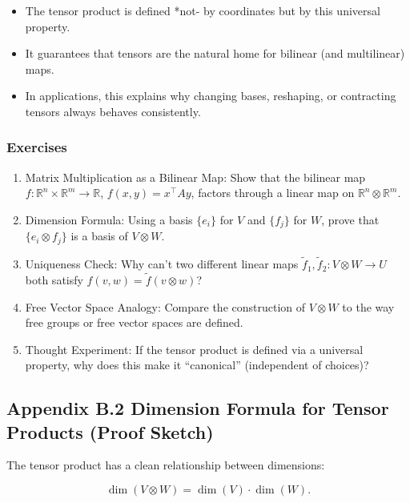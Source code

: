 \documentclass[
  letterpaper,
  DIV=11,
  numbers=noendperiod]{scrreprt}
\providecommand{\tightlist}{%
  \setlength{\itemsep}{0pt}\setlength{\parskip}{0pt}}
\begin{document}
\begin{itemize}
\tightlist
\item
  The tensor product is defined *not- by coordinates but by this
  universal property.
\item
  It guarantees that tensors are the natural home for bilinear (and
  multilinear) maps.
\item
  In applications, this explains why changing bases, reshaping, or
  contracting tensors always behaves consistently.
\end{itemize}

\subsubsection{Exercises}\label{exercises-75}

\begin{enumerate}
\def\labelenumi{\arabic{enumi}.}
\item
  Matrix Multiplication as a Bilinear Map: Show that the bilinear map
  \(f: \mathbb{R}^n \times \mathbb{R}^m \to \mathbb{R}\),
  \(f(x,y) = x^\top A y\), factors through a linear map on
  \(\mathbb{R}^n \otimes \mathbb{R}^m\).
\item
  Dimension Formula: Using a basis \(\{e_i\}\) for \(V\) and \(\{f_j\}\)
  for \(W\), prove that \(\{e_i \otimes f_j\}\) is a basis of
  \(V \otimes W\).
\item
  Uniqueness Check: Why can't two different linear maps
  \(\tilde{f}_1, \tilde{f}_2 : V \otimes W \to U\) both satisfy
  \(f(v,w) = \tilde{f}(v \otimes w)\)?
\item
  Free Vector Space Analogy: Compare the construction of \(V \otimes W\)
  to the way free groups or free vector spaces are defined.
\item
  Thought Experiment: If the tensor product is defined via a universal
  property, why does this make it ``canonical'' (independent of
  choices)?
\end{enumerate}

\subsection{Appendix B.2 Dimension Formula for Tensor Products (Proof
Sketch)}\label{appendix-b.2-dimension-formula-for-tensor-products-proof-sketch}

The tensor product has a clean relationship between dimensions:

\[
\dim(V \otimes W) = \dim(V) \cdot \dim(W).
\]
\end{document}

